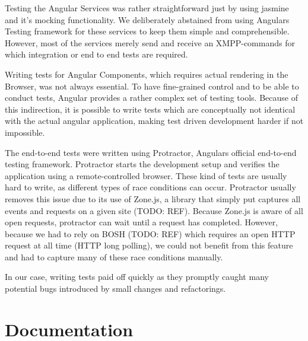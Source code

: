 Testing the Angular Services was rather straightforward just by using jasmine and it's mocking functionality.
We deliberately abstained from using Angulars Testing framework for these services to keep them simple and comprehensible.
However, most of the services merely send and receive an XMPP-commands for which integration or end to end tests are required.

Writing tests for Angular Components, which requires actual rendering in the Browser, was not always essential.
To have fine-grained control and to be able to conduct tests, Angular provides a rather complex set of testing tools.
Because of this indirection, it is possible to write tests which are conceptually not identical with the actual angular application, making test driven development harder if not impossible.

The end-to-end tests were written using Protractor, Angulars official end-to-end testing framework.
Protractor starts the development setup and verifies the application using a remote-controlled browser.
These kind of tests are usually hard to write, as different types of race conditions can occur.
Protractor usually removes this issue due to its use of Zone.js, a library that simply put captures all events and requests on a given site (TODO: REF).
Because Zone.js is aware of all open requests, protractor can wait until a request has completed.
However, because we had to rely on BOSH (TODO: REF) which requires an open HTTP request at all time (HTTP long polling), we could not benefit from this feature and had to capture many of these race conditions manually.

In our case, writing tests paid off quickly as they promptly caught many potential bugs introduced by small changes and refactorings.

\section{Documentation}
